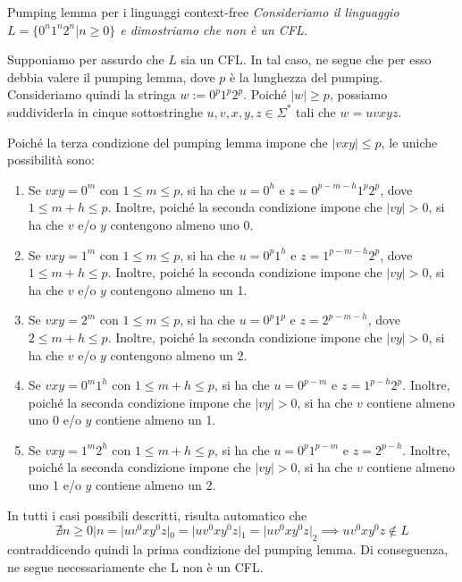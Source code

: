 \begin{Example}{Pumping lemma per i linguaggi context-free}{}
\textit{Consideriamo il linguaggio $L = \{0^n1^n2^n| n\geq0\}$ e dimostriamo che non è un CFL.}

Supponiamo per assurdo che $L$ sia un CFL. In tal caso, ne segue che per esso debbia
valere il pumping lemma, dove $p$ è la lunghezza del pumping.
Consideriamo quindi la stringa $w := 0^p1^p2^p$. Poiché $|w|\geq p$, possiamo suddividerla in cinque sottostringhe $u, v, x, y, z\in \Sigma^*$ tali che $w = uvxyz$. 

Poiché la terza condizione del pumping lemma impone che $|vxy| \leq p$, le uniche
possibilità sono:
\begin{enumerate}
    \item Se $vxy = 0^m$ con $1 \leq m \leq p$, si ha che $u = 0^h$ e $z = 0^{p-m-h}1^p2^p$, dove $1 \leq m + h \leq p$. Inoltre, poiché la seconda condizione impone che $|vy| > 0$, si ha che $v$ e/o $y$ contengono almeno uno 0.
    \item Se $vxy = 1^m$ con $1 \leq m \leq p$, si ha che $u = 0^p1^h$ e $z = 1^{p-m-h}2^p$, dove $1 \leq m + h \leq p$. Inoltre, poiché la seconda condizione impone che $|vy| > 0$, si ha che $v$ e/o $y$ contengono almeno un 1.
    \item Se $vxy = 2^m$ con $1 \leq m \leq p$, si ha che $u = 0^p1^p$ e $z = 2^{p-m-h}$, dove $2\leq m + h \leq p$. Inoltre, poiché la seconda condizione impone che $|vy| > 0$, si ha che $v$ e/o $y$ contengono almeno un 2.
    \item Se $vxy = 0^m1^h$ con $1 \leq m + h \leq p$, si ha che $u = 0^{p-m}$ e $z = 1^{p-h}2^p$. Inoltre, poiché la seconda condizione impone che $|vy| > 0$, si ha che $v$ contiene almeno uno 0 e/o $y$ contiene almeno un 1.
    \item Se $vxy = 1^m2^h$ con $1 \leq m + h \leq p$, si ha che $u = 0^p1^{p-m}$ e $z = 2^{p-h}$. Inoltre, poiché la seconda condizione impone che $|vy| > 0$, si ha che $v$ contiene almeno uno 1 e/o $y$ contiene almeno un 2.
\end{enumerate}

In tutti i casi possibili descritti, risulta automatico che 
\begin{equation*}
    \nexists n\geq0|n=|uv^0xy^0z|_0=|uv^0xy^0z|_1=|uv^0xy^0z|_2\implies uv^0xy^0z\notin L
\end{equation*}
contraddicendo quindi la prima condizione del pumping lemma. Di conseguenza, ne segue necessariamente che L non è un CFL.
\end{Example}


